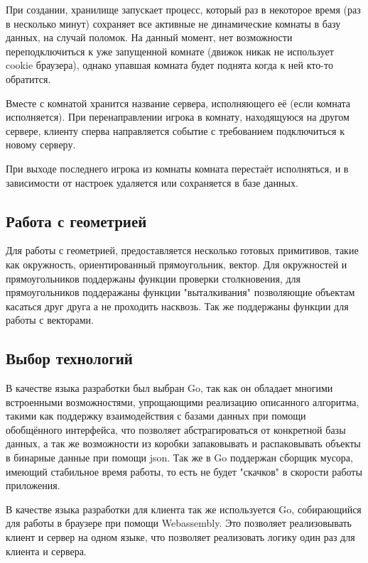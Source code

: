 \documentclass[a4paper,14pt, openany]{book}
\begin{document}
При создании, хранилище запускает процесс, который раз в некоторое время (раз в несколько минут) сохраняет все активные не динамические комнаты в базу данных, на случай поломок. На данный момент, нет возможности переподключиться к уже запущенной комнате (движок никак не использует cookie браузера), однако упавшая комната будет поднята когда к ней кто-то обратится.

Вместе с комнатой хранится название сервера, исполняющего её (если комната исполняется). При перенаправлении игрока в комнату, находящуюся на другом сервере, клиенту сперва направляется событие с требованием подключиться к новому серверу.

При выходе последнего игрока из комнаты комната перестаёт исполняться, и в зависимости от настроек удаляется или сохраняется в базе данных.

\subsection{Работа с геометрией}

Для работы с геометрией, предоставляется несколько готовых примитивов, такие как окружность, ориентированный прямоугольник, вектор. Для окружностей и прямоугольников поддержаны функции проверки столкновения, для прямоугольников поддеражаны функции "выталкивания" позволяющие объектам касаться друг друга а не проходить насквозь. Так же поддержаны функции для работы с векторами. 

\subsection{Выбор технологий}

В качестве языка разработки был выбран Go, так как он обладает многими встроенными возможностями, упрощающими реализацию описанного алгоритма, такими как поддержку взаимодействия с базами данных при помощи обобщённого интерфейса, что позволяет абстрагироваться от конкретной базы данных, а так же возможности из коробки запаковывать и распаковывать объекты в бинарные данные при помощи json. Так же в Go поддержан сборщик мусора, имеющий стабильное время работы, то есть не будет "скачков" в скорости работы приложения. 

В качестве языка разработки для клиента так же используется Go, собирающийся для работы в браузере при помощи Webassembly. Это позволяет реализовывать клиент и сервер на одном языке, что позволяет реализовать логику один раз для клиента и сервера.
\end{document}
